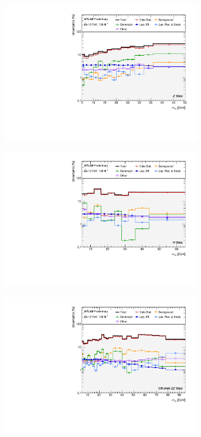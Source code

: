 \begin{figure}[hp]
    \centering
    \begin{subfigure}{.49\textwidth}\centering\includegraphics[width = 0.95\textwidth]{Figures/m4l/Systematics/Unfolded/UnfoldedSys_m34_vs_M4l_Stack_Paper0.pdf}\end{subfigure}
    \begin{subfigure}{.49\textwidth}\centering\includegraphics[width = 0.95\textwidth]{Figures/m4l/Systematics/Unfolded/UnfoldedSys_m34_vs_M4l_Stack_Paper1.pdf}\end{subfigure}
    \begin{subfigure}{.49\textwidth}\centering\includegraphics[width = 0.95\textwidth]{Figures/m4l/Systematics/Unfolded/UnfoldedSys_m34_vs_M4l_Stack_Paper2.pdf}\end{subfigure}

\end{figure}
